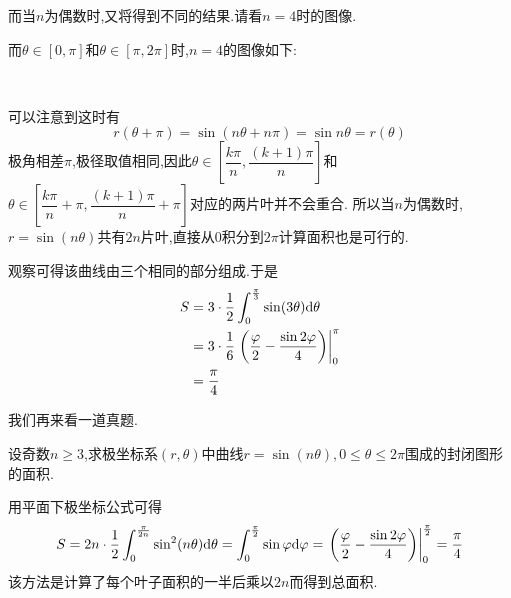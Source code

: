 \documentclass{ctexart}
\begin{document}
\begin{analyze}[Analysis.]
    而当$n$为偶数时,又将得到不同的结果.请看$n=4$时的图像.
    \begin{center}
    \end{center}
    而$\theta\in\left[0,\pi\right]$和$\theta\in\left[\pi,2\pi\right]$时,$n=4$的图像如下:
    \begin{center}
        \ \ \ \ 
    \end{center}
    可以注意到这时有
    $$r(\theta+\pi)=\sin\left(n\theta+n\pi\right)=\sin{n\theta}=r(\theta)$$
    极角相差$\pi$,极径取值相同,因此$\theta\in\left[\dfrac{k\pi}{n},\dfrac{(k+1)\pi}{n}\right]$和$\theta\in\left[\dfrac{k\pi}{n}+\pi,\dfrac{(k+1)\pi}{n}+\pi\right]$对应的两片叶并不会重合.
    所以当$n$为偶数时,$r=\sin(n\theta)$共有$2n$片叶,直接从$0$积分到$2\pi$计算面积也是可行的.
\end{analyze}
\begin{solution}[Solution]
    观察可得该曲线由三个相同的部分组成.于是
    $$\begin{aligned}
        S
        &= 3\cdot\dfrac{1}{2}\int_{0}^{\frac{\pi}{3}}\sin(3\theta)\mathrm{d}\theta \\
        &= 3\cdot\dfrac{1}{6}\left.\left(\dfrac{\varphi}{2}-\dfrac{\sin2\varphi}{4}\right)\right|_0^{\pi} \\
        &= \dfrac{\pi}{4}
    \end{aligned}$$
\end{solution}\noindent
我们再来看一道真题.
\begin{problem}
    设奇数$n\geqslant3$,求极坐标系$(r,\theta)$中曲线$r=\sin(n\theta),0\leqslant\theta\leqslant2\pi$围成的封闭图形的面积.
\end{problem}
\begin{solution}[Solution.]
    用平面下极坐标公式可得
    $$S=2n\cdot\dfrac{1}{2}\int_{0}^{\frac{\pi}{2n}}\sin^2(n\theta)\mathrm{d}\theta=\int_{0}^{\frac{\pi}{2}}\sin\varphi\mathrm{d}\varphi=\left.\left(\dfrac{\varphi}{2}-\dfrac{\sin2\varphi}{4}\right)\right|_0^{\frac{\pi}{2}}=\dfrac{\pi}{4}$$
    该方法是计算了每个叶子面积的一半后乘以$2n$而得到总面积.
\end{solution}
\end{document}
